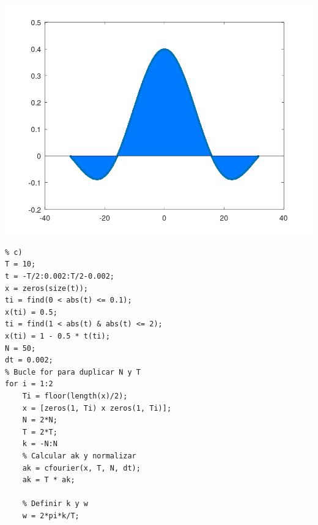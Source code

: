 \documentclass{article}
\begin{document}
\begin{enumerate}[leftmargin=*]
\begin{enumerate}[label=\roman*)]
\begin{center}
\includegraphics[width=0.45\linewidth]{"Imágenes/Figura25"}
\end{center}
\newpage
\begin{lstlisting}
% c)
T = 10;
t = -T/2:0.002:T/2-0.002;
x = zeros(size(t));
ti = find(0 < abs(t) <= 0.1);
x(ti) = 0.5;
ti = find(1 < abs(t) & abs(t) <= 2);
x(ti) = 1 - 0.5 * t(ti);
N = 50;
dt = 0.002;
% Bucle for para duplicar N y T
for i = 1:2
    Ti = floor(length(x)/2);
    x = [zeros(1, Ti) x zeros(1, Ti)];
    N = 2*N;
    T = 2*T;
    k = -N:N
    % Calcular ak y normalizar
    ak = cfourier(x, T, N, dt);
    ak = T * ak;

    % Definir k y w
    w = 2*pi*k/T;


\end{lstlisting}
\end{enumerate}
\end{enumerate}
\end{document}

